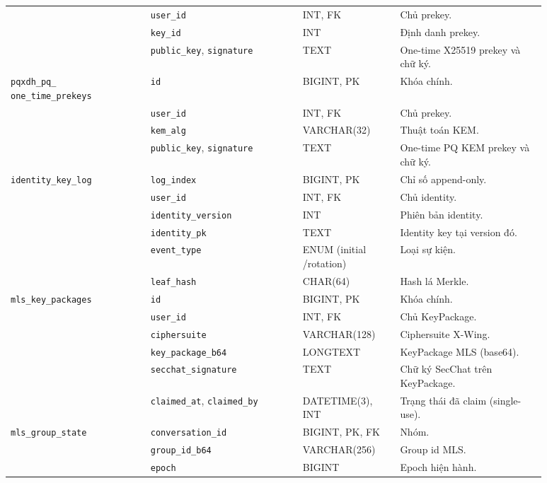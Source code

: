 {\begin{longtable}{|p{0.23\linewidth}|p{0.25\linewidth}|p{0.16\linewidth}|p{0.24\linewidth}|}
 & \texttt{user\_id} & INT, FK & Chủ prekey. \\ \cline{2-4}
 & \texttt{key\_id} & INT & Định danh prekey. \\ \cline{2-4}
 & \texttt{public\_key}, \texttt{signature} & TEXT & One-time X25519 prekey và chữ ký. \\ \hline
\makecell[tl]{\texttt{pqxdh\_pq\_}\\\texttt{one\_time\_prekeys}} & \texttt{id} & BIGINT, PK & Khóa chính. \\ \cline{2-4}
 & \texttt{user\_id} & INT, FK & Chủ prekey. \\ \cline{2-4}
 & \texttt{kem\_alg} & VARCHAR(32) & Thuật toán KEM. \\ \cline{2-4}
 & \texttt{public\_key}, \texttt{signature} & TEXT & One-time PQ KEM prekey và chữ ký. \\ \hline
\texttt{identity\_key\_log} & \texttt{log\_index} & BIGINT, PK & Chỉ số append-only. \\ \cline{2-4}
 & \texttt{user\_id} & INT, FK & Chủ identity. \\ \cline{2-4}
 & \texttt{identity\_version} & INT & Phiên bản identity. \\ \cline{2-4}
 & \texttt{identity\_pk} & TEXT & Identity key tại version đó. \\ \cline{2-4}
 & \texttt{event\_type} & ENUM (initial /rotation) & Loại sự kiện. \\ \cline{2-4}
 & \texttt{leaf\_hash} & CHAR(64) & Hash lá Merkle. \\ \hline
\texttt{mls\_key\_packages} & \texttt{id} & BIGINT, PK & Khóa chính. \\ \cline{2-4}
 & \texttt{user\_id} & INT, FK & Chủ KeyPackage. \\ \cline{2-4}
 & \texttt{ciphersuite} & VARCHAR(128) & Ciphersuite X-Wing. \\ \cline{2-4}
 & \texttt{key\_package\_b64} & LONGTEXT & KeyPackage MLS (base64). \\ \cline{2-4}
 & \texttt{secchat\_signature} & TEXT & Chữ ký SecChat trên KeyPackage. \\ \cline{2-4}
 & \texttt{claimed\_at}, \texttt{claimed\_by} & DATETIME(3), INT & Trạng thái đã claim (single-use). \\ \hline
\texttt{mls\_group\_state} & \texttt{conversation\_id} & BIGINT, PK, FK & Nhóm. \\ \cline{2-4}
 & \texttt{group\_id\_b64} & VARCHAR(256) & Group id MLS. \\ \cline{2-4}
 & \texttt{epoch} & BIGINT & Epoch hiện hành. \\ \cline{2-4}

\end{longtable}}

